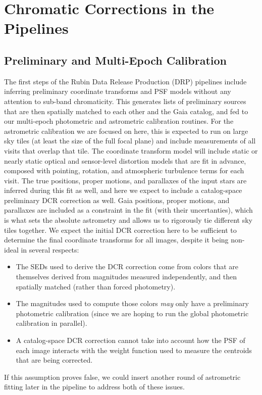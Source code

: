 \documentclass[DM,authoryear,toc]{lsstdoc}
\begin{document}
\section{Chromatic Corrections in the Pipelines}

\subsection{Preliminary and Multi-Epoch Calibration}

The first steps of the Rubin Data Release Production (DRP) pipelines include inferring preliminary coordinate transforms and PSF models without any attention to sub-band chromaticity.
This generates lists of preliminary sources that are then spatially matched to each other and the Gaia catalog, and fed to our multi-epoch photometric and astrometric calibration routines.
For the astrometric calibration we are focused on here, this is expected to run on large sky tiles (at least the size of the full focal plane) and include measurements of all visits that overlap that tile.
The coordinate transform model will include static or nearly static optical and sensor-level distortion models that are fit in advance, composed with pointing, rotation, and atmospheric turbulence terms for each visit.
The true positions, proper motions, and parallaxes of the input stars are inferred during this fit as well, and here we expect to include a catalog-space preliminary DCR correction as well.
Gaia positions, proper motions, and parallaxes are included as a constraint in the fit (with their uncertanties), which is what sets the absolute astrometry and allows us to rigorously tie different sky tiles together.
We expect the initial DCR correction here to be sufficient to determine the final coordinate transforms for all images, despite it being non-ideal in several respects:
\begin{itemize}
  \item The SEDs used to derive the DCR correction come from colors that are themselves derived from magnitudes measured independently, and then spatially matched (rather than forced photometry).
  \item The magnitudes used to compute those colors \emph{may} only have a preliminary photometric calibration (since we are hoping to run the global photometric calibration in parallel).
  \item A catalog-space DCR correction cannot take into account how the PSF of each image interacts with the weight function used to measure the centroids that are being corrected.
\end{itemize}
If this assumption proves false, we could insert another round of astrometric fitting later in the pipeline to address both of these issues.
\end{document}
